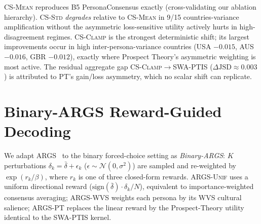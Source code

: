 \documentclass{article}
\begin{document}
\textsc{CS-Mean} reproduces B5 PersonaConsensus exactly (cross-validating our
ablation hierarchy). \textsc{CS-Std} \emph{degrades} relative to \textsc{CS-Mean}
in 9/15 countries-variance amplification without the asymmetric
loss-sensitive utility actively hurts in high-disagreement regimes. \textsc{CS-Clamp} is the strongest
deterministic shift; its largest improvements occur in high inter-persona-variance
countries (USA $-0.015$, AUS $-0.016$, GBR $-0.012$), exactly where Prospect
Theory's asymmetric weighting is most active. The residual aggregate gap
\textsc{CS-Clamp}$\to$SWA-PTIS ($\Delta\text{JSD}\approx0.003$) is attributed to
PT's gain/loss asymmetry, which no scalar shift can replicate.

\section{Binary-ARGS Reward-Guided Decoding}
\label{app:args}

We adapt ARGS~\citep{khanov2024args} to the binary forced-choice setting as
\emph{Binary-ARGS}: $K$ perturbations $\delta_k=\bar\delta+\epsilon_k$
($\epsilon\!\sim\!\mathcal{N}(0,\sigma^2)$) are sampled and re-weighted by
$\exp(r_k/\beta)$, where $r_k$ is one of three closed-form rewards.
\textsc{ARGS-Unif} uses a uniform directional reward
($\text{sign}(\bar\delta)\cdot\delta_k/N$), equivalent to importance-weighted
consensus averaging; \textsc{ARGS-WVS} weights each persona by its WVS cultural
salience; \textsc{ARGS-PT} replaces the linear reward by the Prospect-Theory
utility identical to the SWA-PTIS kernel.
\end{document}
